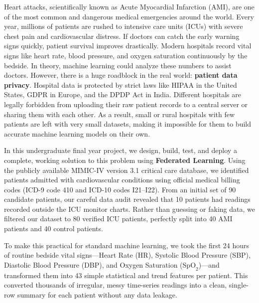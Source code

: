 \documentclass{nitathesis}
\begin{document}
Heart attacks, scientifically known as Acute Myocardial Infarction (AMI), are one of the most common and dangerous medical emergencies around the world. Every year, millions of patients are rushed to intensive care units (ICUs) with severe chest pain and cardiovascular distress. If doctors can catch the early warning signs quickly, patient survival improves drastically. Modern hospitals record vital signs like heart rate, blood pressure, and oxygen saturation continuously by the bedside. In theory, machine learning could analyze these numbers to assist doctors. However, there is a huge roadblock in the real world: \textbf{patient data privacy}. Hospital data is protected by strict laws like HIPAA in the United States, GDPR in Europe, and the DPDP Act in India. Different hospitals are legally forbidden from uploading their raw patient records to a central server or sharing them with each other. As a result, small or rural hospitals with few patients are left with very small datasets, making it impossible for them to build accurate machine learning models on their own.

In this undergraduate final year project, we design, build, test, and deploy a complete, working solution to this problem using \textbf{Federated Learning}. Using the publicly available MIMIC-IV version 3.1 critical care database, we identified patients admitted with cardiovascular conditions using official medical billing codes (ICD-9 code 410 and ICD-10 codes I21--I22). From an initial set of 90 candidate patients, our careful data audit revealed that 10 patients had readings recorded outside the ICU monitor charts. Rather than guessing or faking data, we filtered our dataset to 80 verified ICU patients, perfectly split into 40 AMI patients and 40 control patients.

To make this practical for standard machine learning, we took the first 24 hours of routine bedside vital signs---Heart Rate (HR), Systolic Blood Pressure (SBP), Diastolic Blood Pressure (DBP), and Oxygen Saturation ($\text{SpO}_2$)---and transformed them into 43 simple statistical and trend features per patient. This converted thousands of irregular, messy time-series readings into a clean, single-row summary for each patient without any data leakage.
\end{document}
